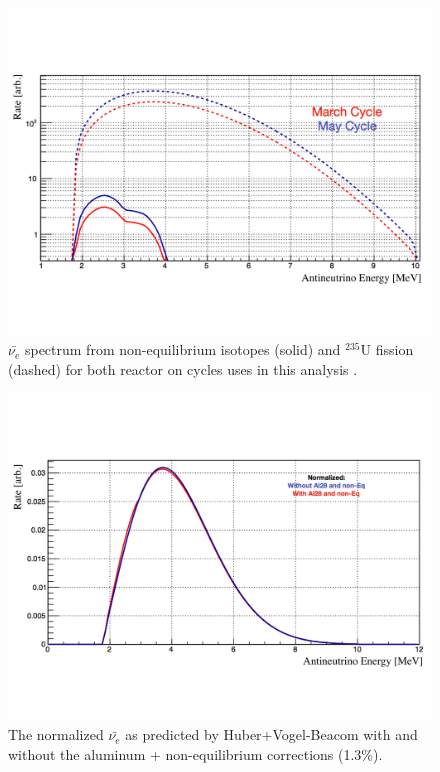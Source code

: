 \begin{figure}[H]
	\centering
	\includegraphics[width=0.7\linewidth]{tex/7-oscillation-images/NonEqContrib}
	\caption[]{$\bar{\nu_{e}}$ spectrum from non-equilibrium isotopes (solid) and $^{235}$U fission (dashed) for both reactor on cycles uses in this analysis \cite{PSurukuchi:2346}.}
	\label{fig:noneqcontrib}
\end{figure}

\begin{figure}[H]
	\centering
	\includegraphics[width=0.7\linewidth]{tex/7-oscillation-images/SpectrumWithCorrections}
	\caption{The normalized $\bar{\nu_{e}}$ as predicted by Huber+Vogel-Beacom with and without the aluminum + non-equilibrium corrections (1.3\%).}
	\label{fig:spectrumwithcorrections}
\end{figure}

